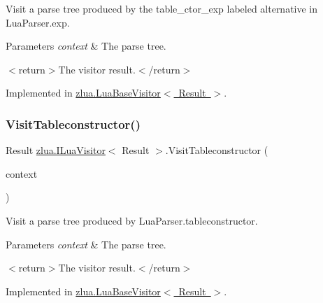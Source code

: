 Visit a parse tree produced by the {\ttfamily table\+\_\+ctor\+\_\+exp} labeled alternative in Lua\+Parser.\+exp. 


\begin{DoxyParams}{Parameters}
{\em context} & The parse tree.\\
\hline
\end{DoxyParams}
$<$return$>$The visitor result.$<$/return$>$ 

Implemented in \mbox{\hyperlink{classzlua_1_1_lua_base_visitor_a074674e65df701a19707c8c7d32e7aec}{zlua.\+Lua\+Base\+Visitor$<$ Result $>$}}.

\mbox{\label{interfacezlua_1_1_i_lua_visitor_a8b04aaf49447f3a8883687237f88d60e}} 
\subsubsection{\texorpdfstring{Visit\+Tableconstructor()}{VisitTableconstructor()}}
{\footnotesize\ttfamily Result \mbox{\hyperlink{interfacezlua_1_1_i_lua_visitor}{zlua.\+I\+Lua\+Visitor}}$<$ Result $>$.Visit\+Tableconstructor (\begin{DoxyParamCaption}\item[{\mbox{[}\+Not\+Null\mbox{]} \mbox{\hyperlink{classzlua_1_1_lua_parser_1_1_tableconstructor_context}{Lua\+Parser.\+Tableconstructor\+Context}}}]{context }\end{DoxyParamCaption})}



Visit a parse tree produced by Lua\+Parser.\+tableconstructor. 


\begin{DoxyParams}{Parameters}
{\em context} & The parse tree.\\
\hline
\end{DoxyParams}
$<$return$>$The visitor result.$<$/return$>$ 

Implemented in \mbox{\hyperlink{classzlua_1_1_lua_base_visitor_a3af0cdb6e39f83c4cd04b9a309b9f130}{zlua.\+Lua\+Base\+Visitor$<$ Result $>$}}.

\mbox{\label{interfacezlua_1_1_i_lua_visitor_acaf973648f49c466c44d3306915b0028}} 
